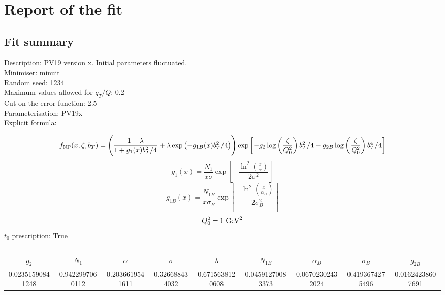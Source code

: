 \documentclass[
]{article}
\date{}
\begin{document}
\hypertarget{report-of-the-fit}{%
\section{Report of the fit}\label{report-of-the-fit}}

\hypertarget{fit-summary}{%
\subsection{Fit summary}\label{fit-summary}}

Description: PV19 version x. Initial parameters fluctuated.\\
Minimiser: minuit\\
Random seed: 1234\\
Maximum values allowed for \(q_T / Q\): 0.2\\
Cut on the error function: 2.5\\
Parameterisation: PV19x\\
Explicit formula:

\[f_{\rm NP}(x,\zeta, b_T)= \Biggl(
\frac{1-\lambda}{1 + g_1(x) b_T^2/4} + \lambda \exp \left(-g_{1B}(x) b_T^2 / 4 \right)\Biggr) \exp\left[- g_2 \log\left(\frac{\zeta}{Q_0^2}\right) b_T^2/4 - g_{2B} \log\left(\frac{\zeta}{Q_0^2}\right) b_T^4/4 \right]\]\[g_1(x) = \frac{N_1}{x\sigma} \exp\left[ - \frac{\ln^2\left(\frac{x}{\alpha}\right)}{2 \sigma^2} \right]\]\[g_{1B}(x) = \frac{N_{1B}}{x\sigma_B} \exp\left[ - \frac{\ln^2\left(\frac{x}{\alpha_B}\right)}{2 \sigma_B^2} \right]\]\[Q_0^2 = 1\;{\rm GeV}^2\]
\(t_0\) prescription: True

\begin{table}[h]

\centering

\begin{tabular}{|c|c|c|c|c|c|c|c|c|} \hline

\textbf{\(g_2\)} & \textbf{\(N_1\)} & \textbf{\(\alpha\)} & \textbf{\(\sigma\)} & \textbf{\(\lambda\)} & \textbf{\(N_{1B}\)} & \textbf{\(\alpha_B\)} & \textbf{\(\sigma_B\)} & \textbf{\(g_{2B}\)} \\ \hline

0.02351590841248 & 0.9422997060112 & 0.2036619541611 & 0.326688434032 & 0.6715638120608 & 0.04591270083373 & 0.06702302432024 & 0.4193674275496 & 0.01624238607691 \\ \hline

\end{tabular}

\caption{}

\end{table}
\end{document}
